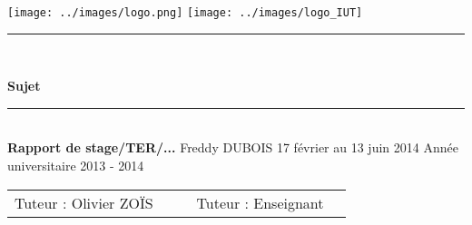 \documentclass[11pt,openright,a4paper]{report}
\begin{document}
	\begin{titlepage}
		\begin{Large}
		\baselineskip=7mm
		\noindent
			\texttt{[image: ../images/logo.png]}
			\hfill
			\texttt{[image: ../images/logo\_IUT]}
			\vskip 30mm
			\begin{center}
				\rule{\textwidth}{0.5 mm}\\
				{\huge\sffamily\bfseries\baselineskip=1cm
					Sujet
				\par}
				\rule{\textwidth}{0.5 mm}\\
				{\Large\sffamily\bfseries 
					Rapport de stage/TER/...
				}
					\vskip 20mm
				Freddy DUBOIS
					\vskip 5mm
				17 février au 13 juin 2014
					\vskip 5mm
				Année universitaire 2013 - 2014
					\vfill
					\vskip 45mm
				\begin{tabular}{l l p{4cm} l l}
					 Tuteur : Olivier ZOÏS		&	&	&	Tuteur : Enseignant	
				\end{tabular}
			\end{center}
		\end{Large}
	\end{titlepage}



\cleardoublepage

\tableofcontents			%



%
%

\end{document}

